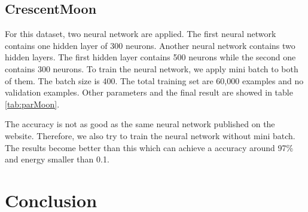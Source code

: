 \documentclass[letterpaper, 10 pt, conference]{ieeeconf}  %
\begin{document}
\subsection{CrescentMoon}
For this dataset, two neural network are applied. The first neural network contains one hidden layer of 300 neurons. Another neural network contains two hidden layers. The first hidden layer contains 500 neurons while the second one contains 300 neurons. To train the neural network, we apply mini batch to both of them. The batch size is 400. The total training set are 60,000 examples and no validation examples. Other parameters and the final result are showed in table \ref{tab:parMoon}.



The accuracy is not as good as the same neural network published on the website. Therefore, we also try to train the neural network without mini batch. The results become better than this which can achieve a accuracy around 97\% and energy smaller than 0.1. 




\section{Conclusion} \label{conclusion}


\end{document}
